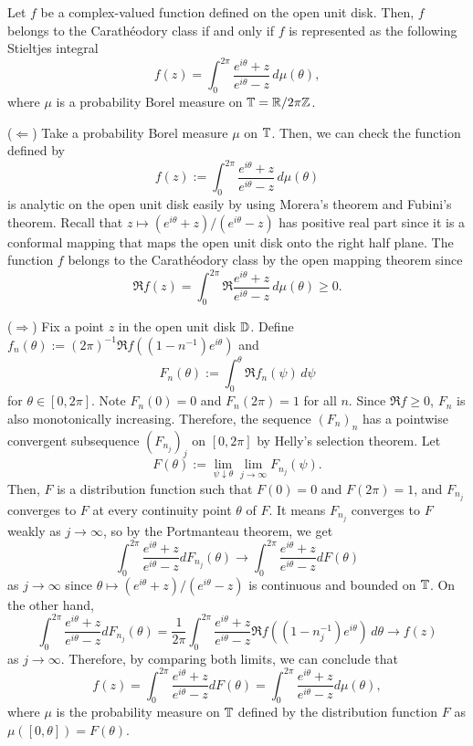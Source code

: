 \documentclass{../../small}
\begin{document}
\begin{thm}
Let $f$ be a complex-valued function defined on the open unit disk.
Then, $f$ belongs to the Carath\'eodory class if and only if $f$ is represented as the following Stieltjes integral
\[f(z)=\int_0^{2\pi}\frac{e^{i\theta}+z}{e^{i\theta}-z}\,d\mu(\theta),\]
where $\mu$ is a probability Borel measure on $\mathbb{T}=\mathbb{R}/2\pi\mathbb{Z}$.
\end{thm}
\begin{pf}
($\Leftarrow$)
Take a probability Borel measure $\mu$ on $\mathbb{T}$.
Then, we can check the function defined by
\[f(z):=\int_0^{2\pi}\frac{e^{i\theta}+z}{e^{i\theta}-z}\,d\mu(\theta)\]
is analytic on the open unit disk easily by using Morera's theorem and Fubini's theorem.
Recall that $z\mapsto(e^{i\theta}+z)/(e^{i\theta}-z)$ has positive real part since it is a conformal mapping that maps the open unit disk onto the right half plane.
The function $f$ belongs to the Carath\'eodory class by the open mapping theorem since
\[\Re f(z)=\int_0^{2\pi}\Re\frac{e^{i\theta}+z}{e^{i\theta}-z}\,d\mu(\theta)\ge0.\]

($\Rightarrow$)
Fix a point $z$ in the open unit disk $\mathbb{D}$.
Define $f_n(\theta):=(2\pi)^{-1}\Re f((1-n^{-1})e^{i\theta})$ and
\[F_n(\theta):=\int_0^\theta\Re f_n(\psi)\,d\psi\]
for $\theta\in[0,2\pi]$.
Note $F_n(0)=0$ and $F_n(2\pi)=1$ for all $n$.
Since $\Re f\ge0$, $F_n$ is also monotonically increasing.
Therefore, the sequence $(F_n)_n$ has a pointwise convergent subsequence $(F_{n_j})_j$ on $[0,2\pi]$ by Helly's selection theorem.
Let
\[F(\theta):=\lim_{\psi\downarrow\theta}\lim_{j\to\infty}F_{n_j}(\psi).\]
Then, $F$ is a distribution function such that $F(0)=0$ and $F(2\pi)=1$, and $F_{n_j}$ converges to $F$ at every continuity point $\theta$ of $F$.
It means $F_{n_j}$ converges to $F$ weakly as $j\to\infty$, so by the Portmanteau theorem, we get
\[\int_0^{2\pi}\frac{e^{i\theta}+z}{e^{i\theta}-z}dF_{n_j}(\theta)\to\int_0^{2\pi}\frac{e^{i\theta}+z}{e^{i\theta}-z}dF(\theta)\]
as $j\to\infty$ since $\theta\mapsto(e^{i\theta}+z)/(e^{i\theta}-z)$ is continuous and bounded on $\mathbb{T}$.
On the other hand,
\[\int_0^{2\pi}\frac{e^{i\theta}+z}{e^{i\theta}-z}dF_{n_j}(\theta)
=\frac1{2\pi}\int_0^{2\pi}\frac{e^{i\theta}+z}{e^{i\theta}-z}\Re f((1-n_j^{-1})e^{i\theta})\,d\theta\to f(z)\]
as $j\to\infty$.
Therefore, by comparing both limits, we can conclude that
\[f(z)=\int_0^{2\pi}\frac{e^{i\theta}+z}{e^{i\theta}-z}dF(\theta)=\int_0^{2\pi}\frac{e^{i\theta}+z}{e^{i\theta}-z}d\mu(\theta),\]
where $\mu$ is the probability measure on $\mathbb{T}$ defined by the distribution function $F$ as $\mu([0,\theta])=F(\theta)$.
\end{pf}
\end{document}
